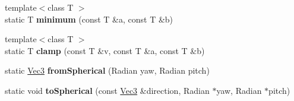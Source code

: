 \begin{DoxyCompactItemize}
\item 
\hypertarget{class_verdi_1_1_math_a5498cba43d2c1cffa69ed2dfc62c0f8c}{{\footnotesize template$<$class T $>$ }\\static \-T {\bfseries minimum} (const \-T \&a, const \-T \&b)}\label{class_verdi_1_1_math_a5498cba43d2c1cffa69ed2dfc62c0f8c}

\item 
\hypertarget{class_verdi_1_1_math_af894a9faca5bb1fd56db22bfe4bac7de}{{\footnotesize template$<$class T $>$ }\\static \-T {\bfseries clamp} (const \-T \&v, const \-T \&a, const \-T \&b)}\label{class_verdi_1_1_math_af894a9faca5bb1fd56db22bfe4bac7de}

\item 
\hypertarget{class_verdi_1_1_math_a5b23a2a83ed1dc71175543690644748d}{static \hyperlink{class_verdi_1_1_vec3}{\-Vec3} {\bfseries from\-Spherical} (\-Radian yaw, \-Radian pitch)}\label{class_verdi_1_1_math_a5b23a2a83ed1dc71175543690644748d}

\item 
\hypertarget{class_verdi_1_1_math_a85ecf6cc3073e27420ad1fa3e05edb2b}{static void {\bfseries to\-Spherical} (const \hyperlink{class_verdi_1_1_vec3}{\-Vec3} \&direction, \-Radian $\ast$yaw, \-Radian $\ast$pitch)}\label{class_verdi_1_1_math_a85ecf6cc3073e27420ad1fa3e05edb2b}

\end{DoxyCompactItemize}
